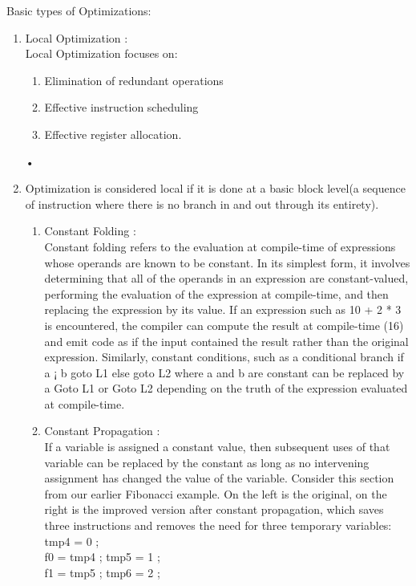 \documentclass[11pt]{article}
\begin{document}
	\noindent
	Basic types of Optimizations: \\
	\begin{enumerate}
		\item  Local Optimization :\\Local Optimization focuses on:
		\begin{enumerate}
			\item Elimination of redundant operations
			\item Effective instruction scheduling
			\item Effective register allocation.
		\end{enumerate}•
		
		\item Optimization is considered local if it is done at a basic block level(a sequence of instruction where there is no branch in and out through its entirety).
		\begin{enumerate}
			\item Constant Folding :\\
			Constant folding refers to the evaluation at compile-time of expressions whose operands are known to be constant. In its simplest form, it involves determining that all of the operands in an expression are constant-valued, performing the evaluation of the expression at compile-time, and then replacing the expression by its value. If an expression such as 10 + 2 * 3 is encountered, the compiler can compute the result at compile-time (16) and emit code as if the input contained the result rather than the original expression. Similarly, constant conditions, such as a conditional branch if a ¡ b goto L1 else goto L2 where a and b are constant can be replaced by a Goto L1 or Goto L2 depending on the truth of the expression evaluated at compile-time.
			\item Constant Propagation :\\
			If a variable is assigned a constant value, then subsequent uses of that variable can be replaced by the constant as long as no intervening assignment has changed the value of the variable. Consider this section from our earlier Fibonacci example. On the left is the original, on the right is the improved version after constant propagation, which saves three instructions and removes the need for three temporary variables:\\
			tmp4 = 0 ;\\
			f0 = tmp4 ; tmp5 = 1 ;\\
			f1 = tmp5 ; tmp6 = 2 ;\\

\end{enumerate}
\end{enumerate}
\end{document}
